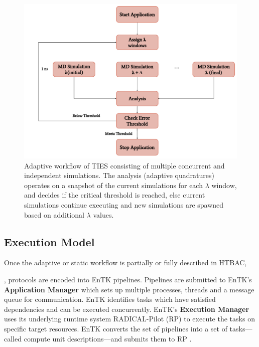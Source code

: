 \begin{figure}
  \centering
  \includegraphics[width=\columnwidth]{figures/adaptive_TIES_workflow_diagram.pdf}
  \caption{Adaptive workflow of TIES consisting of multiple concurrent and
  independent simulations. The analysis (adaptive quadratures) operates on 
  a snapshot of the current simulations for each $\lambda$ window, and decides 
  if the critical threshold is reached, else current simulations continue 
  executing and new simulations are spawned based on additional $\lambda$ 
  values.}
\label{fig:adaptive_ties}
\end{figure}

\subsection{Execution Model}

Once the adaptive or static workflow is partially or fully described in HTBAC, 

, protocols are encoded into EnTK pipelines. 
Pipelines are submitted to EnTK's \textbf{Application Manager} which sets up 
multiple processes, threads and a message queue for communication. EnTK 
identifies tasks which have satisfied dependencies and can be executed 
concurrently. EnTK's \textbf{Execution Manager} uses its underlying runtime 
system RADICAL-Pilot (RP) to execute the tasks on specific target resources. 
EnTK converts the set of pipelines into a set of tasks---called compute unit 
descriptions---and submits them to RP .

